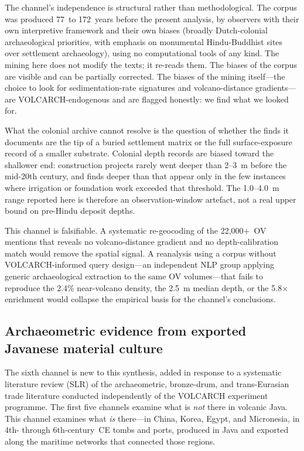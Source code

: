 \documentclass[12pt,a4paper]{article}
\begin{document}
The channel's independence is structural rather than methodological. The corpus was produced 77~to 172~years before the present analysis, by observers with their own interpretive framework and their own biases (broadly Dutch-colonial archaeological priorities, with emphasis on monumental Hindu-Buddhist sites over settlement archaeology), using no computational tools of any kind. The mining here does not modify the texts; it re-reads them. The biases of the corpus are visible and can be partially corrected. The biases of the mining itself---the choice to look for sedimentation-rate signatures and volcano-distance gradients---are VOLCARCH-endogenous and are flagged honestly: we find what we looked for.

What the colonial archive cannot resolve is the question of whether the finds it documents are the tip of a buried settlement matrix or the full surface-exposure record of a smaller substrate. Colonial depth records are biased toward the shallower end: construction projects rarely went deeper than 2--3~m before the mid-20th century, and finds deeper than that appear only in the few instances where irrigation or foundation work exceeded that threshold. The 1.0--4.0~m range reported here is therefore an observation-window artefact, not a real upper bound on pre-Hindu deposit depths.

This channel is falsifiable. A systematic re-geocoding of the 22{,}000+~OV mentions that reveals no volcano-distance gradient and no depth-calibration match would remove the spatial signal. A reanalysis using a corpus without VOLCARCH-informed query design---an independent NLP group applying generic archaeological extraction to the same OV volumes---that fails to reproduce the 2.4\% near-volcano density, the 2.5~m median depth, or the 5.8$\times$ enrichment would collapse the empirical basis for the channel's conclusions.


\subsection{Archaeometric evidence from exported Javanese material culture}
\label{sec:ch6}

The sixth channel is new to this synthesis, added in response to a systematic literature review (SLR) of the archaeometric, bronze-drum, and trans-Eurasian trade literature conducted independently of the VOLCARCH experiment programme. The first five channels examine what is \textit{not} there in volcanic Java. This channel examines what \textit{is} there---in China, Korea, Egypt, and Micronesia, in 4th- through 6th-century~CE tombs and ports, produced in Java and exported along the maritime networks that connected those regions.
\end{document}

